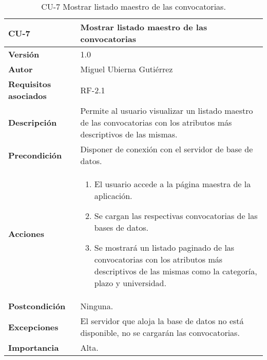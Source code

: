 \begin{table}[p]
	\centering
	\begin{tabularx}{\linewidth}{ p{} p{} }
		\toprule
		\textbf{CU-7}    & \textbf{Mostrar listado maestro de las convocatorias}\\
		\toprule
		\textbf{Versión}              & 1.0    \\
		\textbf{Autor}                & Miguel Ubierna Gutiérrez \\
		\textbf{Requisitos asociados} & RF-2.1 \\
		\textbf{Descripción}          & Permite al usuario visualizar un listado maestro de las convocatorias con los atributos más descriptivos de las mismas.  \\
		\textbf{Precondición}         & Disponer  de conexión con el servidor de base de datos.\\
		\textbf{Acciones}             &
		\begin{enumerate}
			\def\labelenumi{\arabic{enumi}.}
			\tightlist
			\item El usuario accede a la página maestra de la aplicación.
                \item Se cargan las respectivas convocatorias de las bases de datos.
			\item Se mostrará un listado paginado de las convocatorias con los atributos más descriptivos de las mismas como la categoría, plazo y universidad.
		\end{enumerate}\\
		\textbf{Postcondición}        & Ninguna. \\
		\textbf{Excepciones}          & El servidor que aloja la base de datos no está disponible, no se cargarán las convocatorias.  \\
		\textbf{Importancia}          & Alta.  \\
		\bottomrule
	\end{tabularx}
	\caption{CU-7 Mostrar listado maestro de las convocatorias.}
\end{table}


